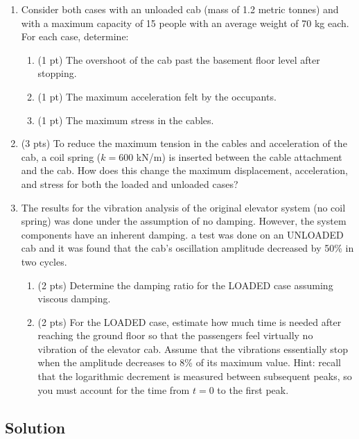 \begin{enumerate}[label=(\alph*)]
    \item Consider both cases with an unloaded cab (mass of 1.2 metric tonnes) and with a maximum
        capacity of 15 people with an average weight of 70 kg each. For each case, determine:
        \begin{enumerate}[label=(\roman*)]
            \item (1 pt) The overshoot of the cab past the basement floor level after stopping.
            \item (1 pt) The maximum acceleration felt by the occupants.
            \item (1 pt) The maximum stress in the cables.
        \end{enumerate}
    \item (3 pts) To reduce the maximum tension in the cables and acceleration of the cab, a coil
        spring ($k = 600$ kN/m) is inserted between the cable attachment and the cab. How does
        this change the maximum displacement, acceleration, and stress for both the loaded and
        unloaded cases?
    \item The results for the vibration analysis of the original elevator system (no coil spring) was done
        under the assumption of no damping. However, the system components have an inherent
        damping. a test was done on an UNLOADED cab and it was found that the cab's oscillation
        amplitude decreased by 50\% in two cycles.
        \begin{enumerate}[label=(\roman*)]
            \item (2 pts) Determine the damping ratio for the LOADED case assuming viscous damping.
            \item (2 pts) For the LOADED case, estimate how much time is needed after reaching the ground
                floor so that the passengers feel virtually no vibration of the elevator cab. Assume that the
                vibrations essentially stop when the amplitude decreases to 8\% of its maximum value.
                Hint: recall that the logarithmic decrement is measured between subsequent peaks, so you
                must account for the time from $t = 0$ to the first peak.
        \end{enumerate}
\end{enumerate}

\subsection*{Solution}
